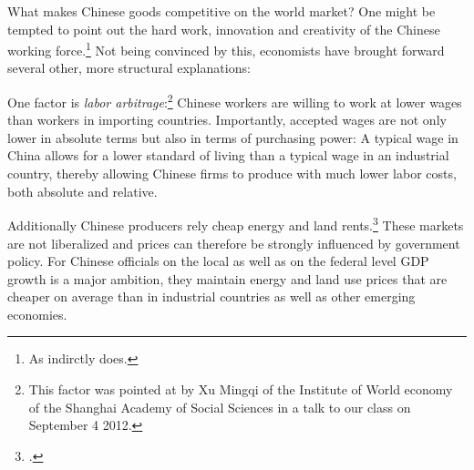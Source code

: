 
What makes Chinese goods competitive on the world market? One might be 
tempted to point out the hard work, innovation and creativity of the 
Chinese working force.\footnote{As \cite[p. 18]{Yu2010} indirctly does.} 
Not being convinced by this, economists have brought forward several 
other, more structural explanations:

One factor is \emph{labor arbitrage}:\footnote{This factor was pointed at 
by Xu Mingqi of the Institute of World economy of the Shanghai Academy 
of Social Sciences in a talk to our class on September 4 2012.} Chinese 
workers are willing to work at lower wages than workers in importing 
countries. Importantly, accepted wages are not only lower in absolute 
terms but also in terms of purchasing power: A typical wage in China 
allows for a lower standard of living than a typical wage in an 
industrial country, thereby allowing Chinese firms to produce with much 
lower labor costs, both absolute and relative. 

Additionally Chinese producers rely cheap energy and land 
rents.\footnote{\cite[pp.  25]{Huang2010}.} These markets are not 
liberalized and prices can therefore be strongly influenced by 
government policy. For Chinese officials on the local as well as on the 
federal level GDP growth is a major ambition, they maintain energy and 
land use prices that are cheaper on average than in industrial countries 
as well as other emerging economies.



